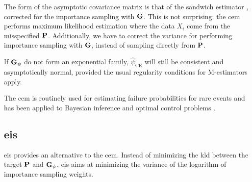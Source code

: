\begin{example}
\end{example}
The form of the asymptotic covariance matrix is that of the sandwich estimator , corrected for the importance sampling with $\G$. This is not surprising: the \gls{cem} performs maximum likelihood estimation where the data $X_{i}$  come from the misspecified $\P$. Additionally, we have to correct the variance for performing importance sampling with $\G$, instead of sampling directly from $\P$.

If $\G_\psi$ do not form an exponential family, $\hat\psi_{\text{CE}}$ will still be consistent and asymptotically normal, provided the usual regularity conditions for M-estimators apply. 



The \gls{cem} is routinely used for estimating failure probabilities for rare events \cite{Homem-de-Mello2007Study}  and has been applied to Bayesian inference \cite{Engel2023Bayesian,Ehre2023Certified} and optimal control problems \cite{Kappen2016Adaptive,Zhang2014Applications}.

\subsection{\texorpdfstring{\Acrfull{eis}}{Efficient importance sampling}}
\gls{eis}\cite{Richard2007Efficient} provides an alternative to the \gls{cem}. Instead of minimizing the \gls{kld} between the target $\P$ and $\G_{\psi}$, \gls{eis} aims at minimizing the variance of the logarithm of importance sampling weights. 



